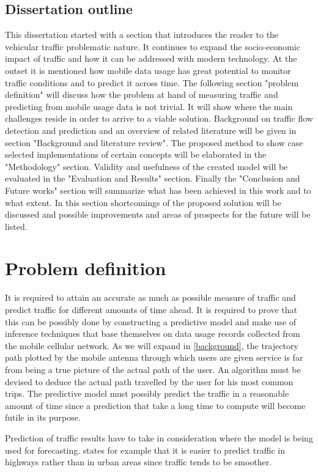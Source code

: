 \documentclass[12pt, a4paper]{report}
\theoremstyle{definition}
\theoremstyle{definition}%
\theoremstyle{definition}%
\theoremstyle{definition}%
\theoremstyle{definition}%
\theoremstyle{definition}%
\begin{document}
\section{Dissertation outline}
This dissertation started with a section that introduces the reader to the vehicular traffic problematic nature. It continues to expand the socio-economic impact of traffic and how it can be addressed with modern technology. At the outset it is mentioned how mobile data usage has great potential to monitor traffic conditions and to predict it across time. The following section "problem definition" will discuss how the problem at hand of measuring traffic and predicting from mobile usage data is not trivial. It will show where the main challenges reside in order to arrive to a viable solution. Background on traffic flow detection and prediction and an overview of related literature will be given in section "Background and literature review". The proposed method to show case selected implementations of certain concepts will be elaborated in the "Methodology" section.  Validity and usefulness of the created model will be evaluated in the "Evaluation and Results" section. Finally the "Conclusion and Future works" section will summarize what has been achieved in this work and to what extent.  In this section shortcomings of the proposed solution will be discussed and possible improvements and areas of prospects for the future will be listed.



\chapter{Problem definition}
It is required to attain an accurate as much as possible measure of traffic and predict traffic for different amounts of time ahead. It is required to prove that this can be possibly done by constructing a predictive model and make use of inference techniques that base themselves on data usage records collected from the mobile cellular network. As we will expand in \ref{background}, the trajectory path plotted by the mobile antenna through which users are given service is far from being a true picture of the actual path of the user.  An algorithm must be devised to deduce the actual path travelled by the user for his most common trips. The predictive model must possibly predict the traffic in a reasonable amount of time since a prediction that take a long time to compute will become futile in its purpose.

Prediction of traffic results have to take in consideration where the model is being used for forecasting. \cite{Sommer2013} states for example that it is easier to predict traffic in highways rather than in urban areas since traffic tends to be smoother.
\end{document}
